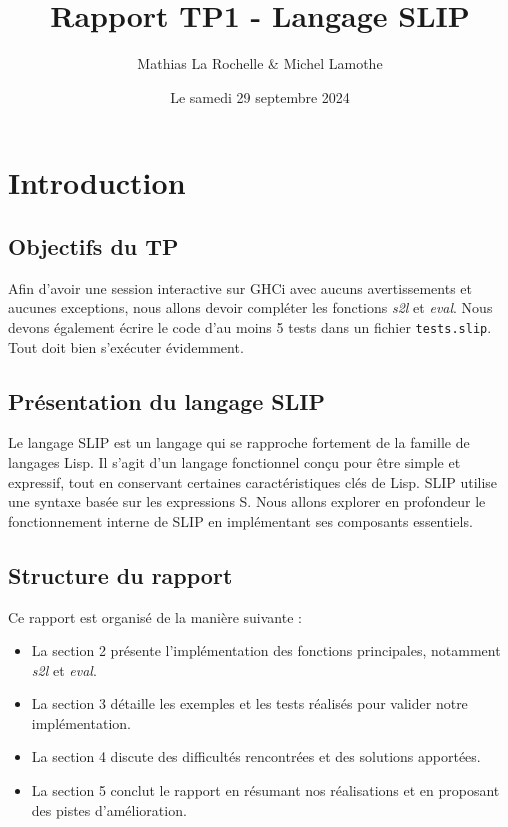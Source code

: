 \documentclass{article}
\title{Rapport TP1 - Langage SLIP}
\author{Mathias La Rochelle \& Michel Lamothe}
\date{Le samedi 29 septembre 2024}
\begin{document}
\maketitle
\setlength{\parindent}{0pt}


\section{Introduction}
\subsection{Objectifs du TP}
Afin d'avoir une session interactive sur GHCi avec aucuns avertissements et aucunes exceptions, nous allons devoir compléter les fonctions \textit{s2l} et \textit{eval}. Nous devons également écrire le code d'au moins 5 tests dans un fichier \texttt{tests.slip}. Tout doit bien s'exécuter évidemment. \\

\subsection{Présentation du langage SLIP}
Le langage SLIP est un langage qui se rapproche fortement de la famille de langages Lisp. Il s'agit d'un langage fonctionnel conçu pour être simple et expressif, tout en conservant certaines caractéristiques clés de Lisp. SLIP utilise une syntaxe basée sur les expressions S. Nous allons explorer en profondeur le fonctionnement interne de SLIP en implémentant ses composants essentiels.

\subsection{Structure du rapport}
Ce rapport est organisé de la manière suivante :
\begin{itemize}
    \item La section 2 présente l'implémentation des fonctions principales, notamment \textit{s2l} et \textit{eval}.
    \item La section 3 détaille les exemples et les tests réalisés pour valider notre implémentation.
    \item La section 4 discute des difficultés rencontrées et des solutions apportées.
    \item La section 5 conclut le rapport en résumant nos réalisations et en proposant des pistes d'amélioration.
\end{itemize}
\end{document}
